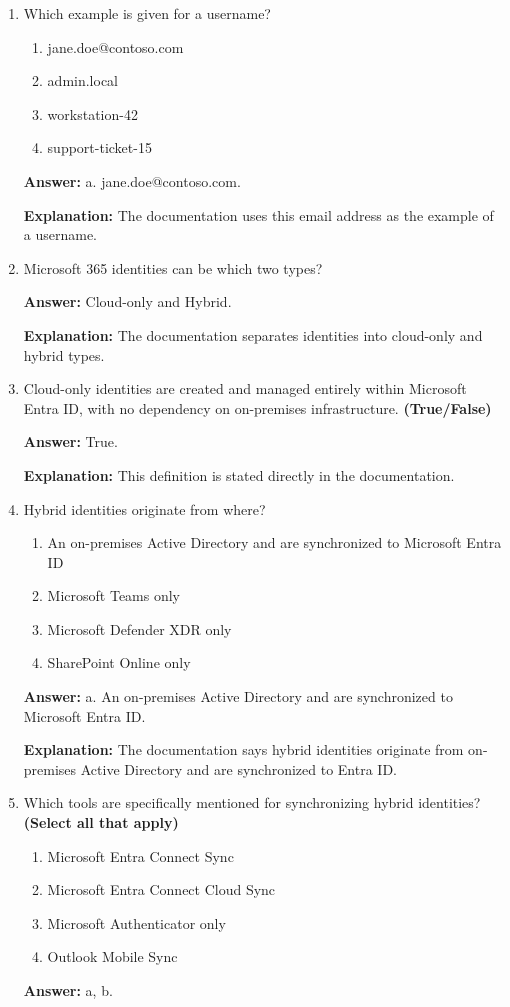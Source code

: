 \documentclass[10pt]{article}
\begin{document}
\begin{enumerate}[leftmargin=*]
\textbf{Explanation:} All four are listed in the documentation as parts of a typical identity.

\item Which example is given for a username?
\begin{enumerate}[label=\alph*., leftmargin=1.5em]
\item jane.doe@contoso.com
\item admin.local
\item workstation-42
\item support-ticket-15
\end{enumerate}
\textbf{Answer:} a. jane.doe@contoso.com.

\textbf{Explanation:} The documentation uses this email address as the example of a username.

\item Microsoft 365 identities can be which two types?

\textbf{Answer:} Cloud-only and Hybrid.

\textbf{Explanation:} The documentation separates identities into cloud-only and hybrid types.

\item Cloud-only identities are created and managed entirely within Microsoft Entra ID, with no dependency on on-premises infrastructure. \textbf{(True/False)}

\textbf{Answer:} True.

\textbf{Explanation:} This definition is stated directly in the documentation.

\item Hybrid identities originate from where?
\begin{enumerate}[label=\alph*., leftmargin=1.5em]
\item An on-premises Active Directory and are synchronized to Microsoft Entra ID
\item Microsoft Teams only
\item Microsoft Defender XDR only
\item SharePoint Online only
\end{enumerate}
\textbf{Answer:} a. An on-premises Active Directory and are synchronized to Microsoft Entra ID.

\textbf{Explanation:} The documentation says hybrid identities originate from on-premises Active Directory and are synchronized to Entra ID.

\item Which tools are specifically mentioned for synchronizing hybrid identities? \textbf{(Select all that apply)}
\begin{enumerate}[label=\alph*., leftmargin=1.5em]
\item Microsoft Entra Connect Sync
\item Microsoft Entra Connect Cloud Sync
\item Microsoft Authenticator only
\item Outlook Mobile Sync
\end{enumerate}
\textbf{Answer:} a, b.


\end{enumerate}
\end{document}
